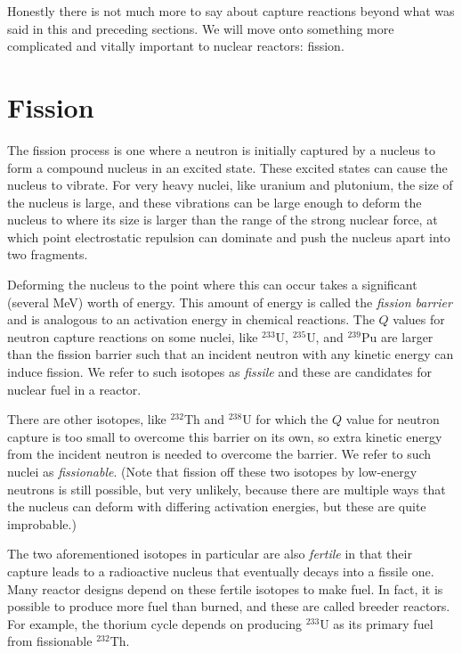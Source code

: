 Honestly there is not much more to say about capture reactions beyond what was said in this and preceding sections. We will move onto something more complicated and vitally important to nuclear reactors: fission.

\section{Fission}

The fission process is one where a neutron is initially captured by a nucleus to form a compound nucleus in an excited state. These excited states can cause the nucleus to vibrate. For very heavy nuclei, like uranium and plutonium, the size of the nucleus is large, and these vibrations can be large enough to deform the nucleus to where its size is larger than the range of the strong nuclear force, at which point electrostatic repulsion can dominate and push the nucleus apart into two fragments.

Deforming the nucleus to the point where this can occur takes a significant (several MeV) worth of energy. This amount of energy is called the \emph{fission barrier} and is analogous to an activation energy in chemical reactions. The $Q$ values for neutron capture reactions on some nuclei, like $^{233}$U, $^{235}$U, and $^{239}$Pu are larger than the fission barrier such that an incident neutron with any kinetic energy can induce fission. We refer to such isotopes as \emph{fissile} and these are candidates for nuclear fuel in a reactor. 

There are other isotopes, like $^{232}$Th and $^{238}$U for which the $Q$ value for neutron capture is too small to overcome this barrier on its own, so extra kinetic energy from the incident neutron is needed to overcome the barrier. We refer to such nuclei as \emph{fissionable}. (Note that fission off these two isotopes by low-energy neutrons is still possible, but very unlikely, because there are multiple ways that the nucleus can deform with differing activation energies, but these are quite improbable.) 

The two aforementioned isotopes in particular are also \emph{fertile} in that their capture leads to a radioactive nucleus that eventually decays into a fissile one. Many reactor designs depend on these fertile isotopes to make fuel. In fact, it is possible to produce more fuel than burned, and these are called breeder reactors. For example, the thorium cycle depends on producing $^{233}$U as its primary fuel from fissionable $^{232}$Th.


